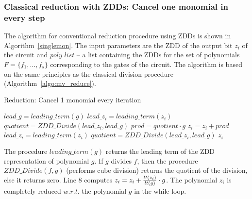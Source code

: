 \subsubsection{Classical reduction with ZDDs: Cancel one monomial in
  every step} 

The algorithm for conventional reduction procedure using ZDDs is
shown in Algorithm~\ref{singlemon}. The input parameters are the ZDD
of the output bit $z_i$ of the circuit and $poly\_list$ -- a list
containing the ZDDs for the set of polynomials $F =
\{f_1,\dots,f_s\}$ corresponding to the
gates of the circuit. The algorithm is based on the same principles as
the classical division procedure (Algorithm~\ref{algo:mv_reduce}). 




\begin{algorithm}
\caption{Reduction: Cancel 1 monomial every iteration}
\label{singlemon}
\begin{algorithmic}[1]
{\small
{}
\State $lead\_g = leading\_term(g)$
\State $lead\_z_i = leading\_term(z_i)$
\State $quotient = ZDD\_Divide(lead\_z_i,lead\_g)$
\State $prod = quotient \cdot g$
\State $z_i = z_i + prod$
\State $lead\_z_i = leading\_term(z_i)$
\State $quotient = ZDD\_Divide(lead\_z_i,lead\_g)$
\EndWhile
\EndFor
\State \Return $z_i$
\EndProcedure
}
\end{algorithmic}
\end{algorithm}

The procedure $leading\_term(g)$ returns the leading term of 
the ZDD representation of polynomial $g$. 
If $g$ divides $f$, then the procedure $ZDD\_Divide(f,g)$ (performs cube division) returns the quotient of the
division,  else it returns zero. Line 8 computes $z_i = z_i +
{lt(z_i) \over lt(g)}\cdot g$. The polynomial $z_i$ is completely reduced
$w.r.t.$ the polynomial $g$ in the while loop. 

